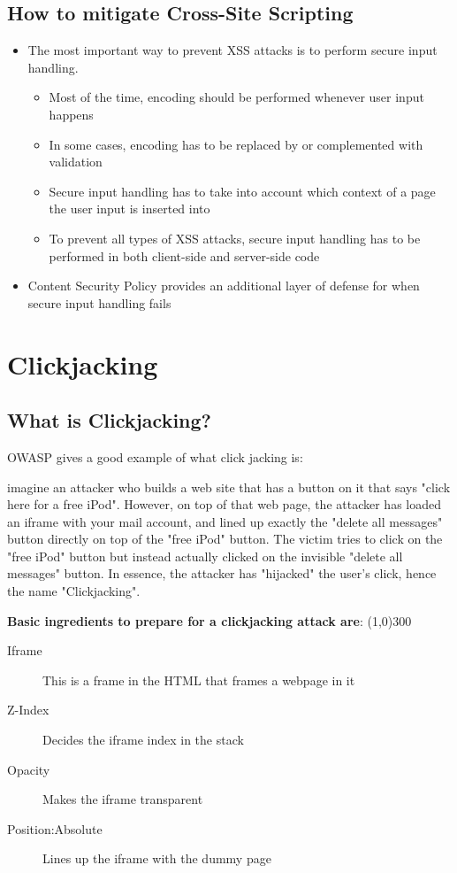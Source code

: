 \documentclass[a4paper, titlepage]{article}
\begin{document}
\subsection{How to mitigate Cross-Site Scripting}
\begin{itemize}
    \item The most important way to prevent XSS attacks is to perform secure input handling.
        \begin{itemize}
            \item Most of the time, encoding should be performed whenever user input happens
            \item In some cases, encoding has to be replaced by or complemented with validation
            \item Secure input handling has to take into account which context of a page the user input is inserted into
            \item To prevent all types of XSS attacks, secure input handling has to be performed in both client-side and server-side code
        \end{itemize}
    \item Content Security Policy provides an additional layer of defense for when secure input handling fails
\end{itemize}
\newpage

\section{Clickjacking}
\subsection{What is Clickjacking?}
OWASP gives a good example of what click jacking is:

imagine an attacker who builds a web site that has a button on it that says "click here for a free iPod". However, on top of that web page, the attacker has loaded an iframe with your mail account, and lined up exactly the "delete all messages" button directly on top of the "free iPod" button. The victim tries to click on the "free iPod" button but instead actually clicked on the invisible "delete all messages" button. In essence, the attacker has "hijacked" the user's click, hence the name "Clickjacking".  \newline
\begin{center}
\textbf{Basic ingredients to prepare for a clickjacking attack are}: \newline
\line(1,0){300} \\

\begin{description}
    \item[Iframe] This is a frame in the HTML that frames a webpage in it
    \item[Z-Index] Decides the iframe index in the stack
    \item[Opacity] Makes the iframe transparent
    \item[Position:Absolute] Lines up the iframe with the dummy page
\end{description}
\end{center}
\end{document}
